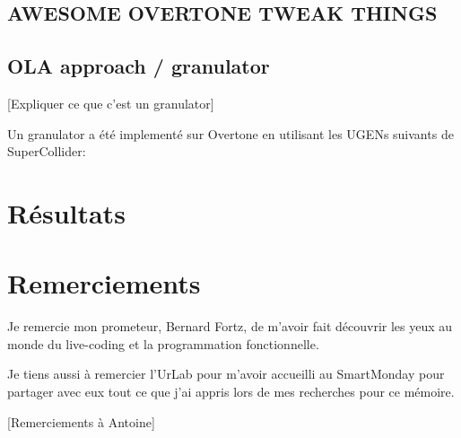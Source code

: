 \documentclass[letterpaper]{article}
\begin{document}
\subsection{AWESOME OVERTONE TWEAK THINGS}
\subsection{OLA approach / granulator}
[Expliquer ce que c'est un granulator]

Un granulator a été implementé sur Overtone en utilisant les UGENs suivants
de SuperCollider:


\section{Résultats}

\section{Remerciements}
  Je remercie mon prometeur, Bernard Fortz, de m'avoir fait découvrir
  les yeux au monde du live-coding et la programmation fonctionnelle.

  Je tiens aussi à remercier l'UrLab pour m'avoir accueilli au SmartMonday
  pour partager avec eux tout ce que j'ai appris lors de mes recherches
  pour ce mémoire.

  [Remerciements à Antoine]

\footnotesize



\end{document}
